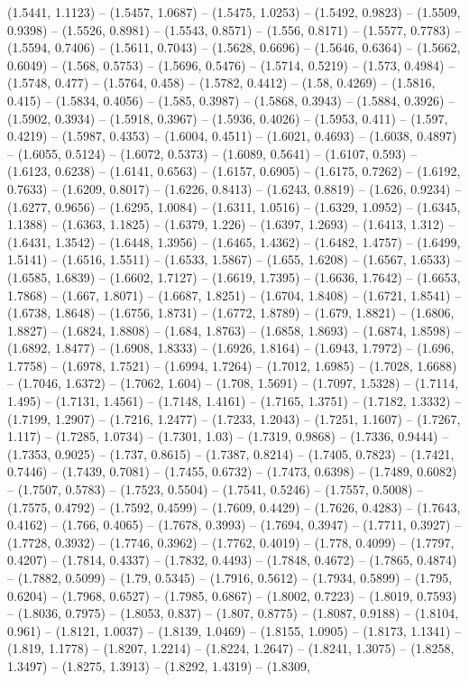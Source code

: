 (1.5441, 1.1123) -- (1.5457, 1.0687) -- (1.5475, 1.0253) -- (1.5492, 0.9823) -- (1.5509, 0.9398) -- (1.5526, 0.8981) -- (1.5543, 0.8571) -- (1.556, 0.8171) -- (1.5577, 0.7783) -- (1.5594, 0.7406) -- (1.5611, 0.7043) -- (1.5628, 0.6696) -- (1.5646, 0.6364) -- (1.5662, 0.6049) -- (1.568, 0.5753) -- (1.5696, 0.5476) -- (1.5714, 0.5219) -- (1.573, 0.4984) -- (1.5748, 0.477) -- (1.5764, 0.458) -- (1.5782, 0.4412) -- (1.58, 0.4269) -- (1.5816, 0.415) -- (1.5834, 0.4056) -- (1.585, 0.3987) -- (1.5868, 0.3943) -- (1.5884, 0.3926) -- (1.5902, 0.3934) -- (1.5918, 0.3967) -- (1.5936, 0.4026) -- (1.5953, 0.411) -- (1.597, 0.4219) -- (1.5987, 0.4353) -- (1.6004, 0.4511) -- (1.6021, 0.4693) -- (1.6038, 0.4897) -- (1.6055, 0.5124) -- (1.6072, 0.5373) -- (1.6089, 0.5641) -- (1.6107, 0.593) -- (1.6123, 0.6238) -- (1.6141, 0.6563) -- (1.6157, 0.6905) -- (1.6175, 0.7262) -- (1.6192, 0.7633) -- (1.6209, 0.8017) -- (1.6226, 0.8413) -- (1.6243, 0.8819) -- (1.626, 0.9234) -- (1.6277, 0.9656) -- (1.6295, 1.0084) -- (1.6311, 1.0516) -- (1.6329, 1.0952) -- (1.6345, 1.1388) -- (1.6363, 1.1825) -- (1.6379, 1.226) -- (1.6397, 1.2693) -- (1.6413, 1.312) -- (1.6431, 1.3542) -- (1.6448, 1.3956) -- (1.6465, 1.4362) -- (1.6482, 1.4757) -- (1.6499, 1.5141) -- (1.6516, 1.5511) -- (1.6533, 1.5867) -- (1.655, 1.6208) -- (1.6567, 1.6533) -- (1.6585, 1.6839) -- (1.6602, 1.7127) -- (1.6619, 1.7395) -- (1.6636, 1.7642) -- (1.6653, 1.7868) -- (1.667, 1.8071) -- (1.6687, 1.8251) -- (1.6704, 1.8408) -- (1.6721, 1.8541) -- (1.6738, 1.8648) -- (1.6756, 1.8731) -- (1.6772, 1.8789) -- (1.679, 1.8821) -- (1.6806, 1.8827) -- (1.6824, 1.8808) -- (1.684, 1.8763) -- (1.6858, 1.8693) -- (1.6874, 1.8598) -- (1.6892, 1.8477) -- (1.6908, 1.8333) -- (1.6926, 1.8164) -- (1.6943, 1.7972) -- (1.696, 1.7758) -- (1.6978, 1.7521) -- (1.6994, 1.7264) -- (1.7012, 1.6985) -- (1.7028, 1.6688) -- (1.7046, 1.6372) -- (1.7062, 1.604) -- (1.708, 1.5691) -- (1.7097, 1.5328) -- (1.7114, 1.495) -- (1.7131, 1.4561) -- (1.7148, 1.4161) -- (1.7165, 1.3751) -- (1.7182, 1.3332) -- (1.7199, 1.2907) -- (1.7216, 1.2477) -- (1.7233, 1.2043) -- (1.7251, 1.1607) -- (1.7267, 1.117) -- (1.7285, 1.0734) -- (1.7301, 1.03) -- (1.7319, 0.9868) -- (1.7336, 0.9444) -- (1.7353, 0.9025) -- (1.737, 0.8615) -- (1.7387, 0.8214) -- (1.7405, 0.7823) -- (1.7421, 0.7446) -- (1.7439, 0.7081) -- (1.7455, 0.6732) -- (1.7473, 0.6398) -- (1.7489, 0.6082) -- (1.7507, 0.5783) -- (1.7523, 0.5504) -- (1.7541, 0.5246) -- (1.7557, 0.5008) -- (1.7575, 0.4792) -- (1.7592, 0.4599) -- (1.7609, 0.4429) -- (1.7626, 0.4283) -- (1.7643, 0.4162) -- (1.766, 0.4065) -- (1.7678, 0.3993) -- (1.7694, 0.3947) -- (1.7711, 0.3927) -- (1.7728, 0.3932) -- (1.7746, 0.3962) -- (1.7762, 0.4019) -- (1.778, 0.4099) -- (1.7797, 0.4207) -- (1.7814, 0.4337) -- (1.7832, 0.4493) -- (1.7848, 0.4672) -- (1.7865, 0.4874) -- (1.7882, 0.5099) -- (1.79, 0.5345) -- (1.7916, 0.5612) -- (1.7934, 0.5899) -- (1.795, 0.6204) -- (1.7968, 0.6527) -- (1.7985, 0.6867) -- (1.8002, 0.7223) -- (1.8019, 0.7593) -- (1.8036, 0.7975) -- (1.8053, 0.837) -- (1.807, 0.8775) -- (1.8087, 0.9188) -- (1.8104, 0.961) -- (1.8121, 1.0037) -- (1.8139, 1.0469) -- (1.8155, 1.0905) -- (1.8173, 1.1341) -- (1.819, 1.1778) -- (1.8207, 1.2214) -- (1.8224, 1.2647) -- (1.8241, 1.3075) -- (1.8258, 1.3497) -- (1.8275, 1.3913) -- (1.8292, 1.4319) -- (1.8309, 